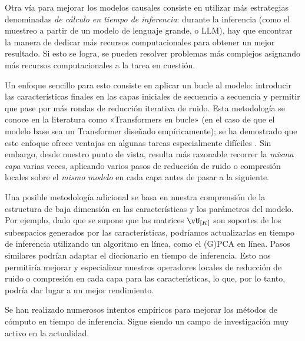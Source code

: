 \documentclass[../../book-main.tex]{subfiles}
\begin{document}
\begin{example}
    Otra vía para mejorar los modelos causales consiste en utilizar más estrategias denominadas
    \textit{de cálculo en tiempo de inferencia}: durante la inferencia
    (como el muestreo a partir de un modelo de lenguaje grande, o LLM), hay que encontrar la manera de dedicar más
    recursos computacionales para obtener un mejor resultado. Si esto se logra,
    se pueden resolver problemas más complejos asignando más
    recursos computacionales a la tarea en cuestión.

    Un enfoque sencillo para esto consiste en aplicar un bucle al modelo: introducir las características finales
    en las capas iniciales de secuencia a secuencia y permitir
    que pase por más rondas de reducción iterativa de ruido. Esta
    metodología se conoce en la literatura como «Transformers en bucle»
    (en el caso de que el modelo base sea un
    Transformer diseñado empíricamente); se ha demostrado que este enfoque
    ofrece ventajas en algunas tareas especialmente difíciles
    \citep{giannou2023looped,yang2023looped,saunshi2025reasoning}.
    Sin embargo, desde nuestro punto de vista, resulta más razonable recorrer
    la \textit{misma capa} varias veces, aplicando
    varios pasos de reducción de ruido o compresión locales sobre el
    \textit{mismo modelo} en cada capa antes de pasar a la siguiente.

    Una posible metodología adicional se basa en nuestra comprensión
    de la estructura de baja dimensión en las características y los parámetros
    del modelo. Por ejemplo, dado que se supone que las matrices \(\vU_{[K]}\)
    son soportes de los subespacios generados por las
    características, podríamos actualizarlas en tiempo de inferencia utilizando un algoritmo en línea,
    como el (G)PCA en línea. Pasos similares podrían 
    adaptar el diccionario en tiempo de inferencia. Esto nos permitiría
    mejorar y especializar nuestros operadores locales de reducción de ruido o compresión
    en cada capa para las características, lo que, por lo tanto, podría
    dar lugar a un mejor rendimiento.

    Se han realizado numerosos intentos empíricos para mejorar los métodos de cómputo en tiempo de inferencia.
    Sigue siendo un campo de investigación muy activo en la actualidad.
\end{example}

\end{document}
